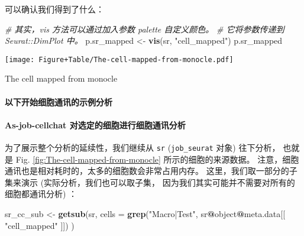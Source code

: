 \documentclass[
]{article}
\newenvironment{Shaded}{\begin{snugshade}}{\end{snugshade}}
\newcommand{\CommentTok}[1]{\textcolor[rgb]{0.56,0.35,0.01}{\textit{#1}}}
\newcommand{\DataTypeTok}[1]{\textcolor[rgb]{0.13,0.29,0.53}{#1}}
\newcommand{\KeywordTok}[1]{\textcolor[rgb]{0.13,0.29,0.53}{\textbf{#1}}}
\newcommand{\NormalTok}[1]{#1}
\newcommand{\OperatorTok}[1]{\textcolor[rgb]{0.81,0.36,0.00}{\textbf{#1}}}
\newcommand{\StringTok}[1]{\textcolor[rgb]{0.31,0.60,0.02}{#1}}
\begin{document}
可以确认我们得到了什么：

\begin{Shaded}
\begin{Highlighting}[]
\CommentTok{\# 其实，\textasciigrave{}vis\textasciigrave{} 方法可以通过加入参数 \textasciigrave{}palette\textasciigrave{} 自定义颜色。}
\CommentTok{\# 它将参数传递到 \textasciigrave{}Seurat::DimPlot\textasciigrave{} 中。}
\NormalTok{p.sr\_mapped \textless{}{-}}\StringTok{ }\KeywordTok{vis}\NormalTok{(sr, }\StringTok{"cell\_mapped"}\NormalTok{)}
\NormalTok{p.sr\_mapped}
\end{Highlighting}
\end{Shaded}

\def\@captype{figure}
\begin{center}
\texttt{[image: Figure+Table/The-cell-mapped-from-monocle.pdf]}
\caption{The cell mapped from monocle}\label{fig:The-cell-mapped-from-monocle}
\end{center}

\hypertarget{ux4ee5ux4e0bux5f00ux59cbux7ec6ux80deux901aux8bafux7684ux793aux4f8bux5206ux6790}{%
\paragraph{以下开始细胞通讯的示例分析}\label{ux4ee5ux4e0bux5f00ux59cbux7ec6ux80deux901aux8bafux7684ux793aux4f8bux5206ux6790}}

\hypertarget{as-job-cellchat-ux5bf9ux9009ux5b9aux7684ux7ec6ux80deux8fdbux884cux7ec6ux80deux901aux8bafux5206ux6790}{%
\paragraph{As-job-cellchat 对选定的细胞进行细胞通讯分析}\label{as-job-cellchat-ux5bf9ux9009ux5b9aux7684ux7ec6ux80deux8fdbux884cux7ec6ux80deux901aux8bafux5206ux6790}}

为了展示整个分析的延续性，我们继续从 \texttt{sr} (\texttt{job\_seurat} 对象) 往下分析，
也就是 Fig. \ref{fig:The-cell-mapped-from-monocle} 所示的细胞的来源数据。
注意，细胞通讯也是相对耗时的，太多的细胞数会非常占用内存。
这里，我们取一部分的子集来演示 (实际分析，我们也可以取子集，
因为我们其实可能并不需要对所有的细胞都通讯分析) ：

\begin{Shaded}
\begin{Highlighting}[]
\NormalTok{sr\_cc\_sub \textless{}{-}}\StringTok{ }\KeywordTok{getsub}\NormalTok{(sr,}
  \DataTypeTok{cells =} \KeywordTok{grep}\NormalTok{(}\StringTok{"Macro|Test"}\NormalTok{, sr}\OperatorTok{@}\NormalTok{object}\OperatorTok{@}\NormalTok{meta.data[[ }\StringTok{"cell\_mapped"}\NormalTok{ ]])}
\NormalTok{)}
\end{Highlighting}
\end{Shaded}
\end{document}
